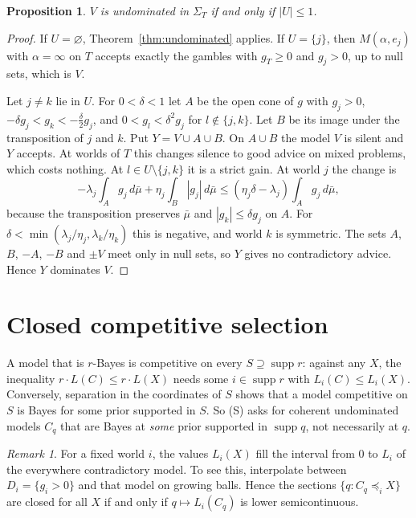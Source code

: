 \documentclass[11pt]{article}
\newtheorem{proposition}[theorem]{Proposition}
\theoremstyle{remark}\newtheorem{remark}[theorem]{Remark}
\newcommand{\supp}{\operatorname{supp}}
\begin{document}
\begin{proposition}\label{prop:V}
$V$ is undominated in $\Sigma_T$ if and only if $|U|\le1$.
\end{proposition}
\begin{proof}
If $U=\varnothing$, Theorem~\ref{thm:undominated} applies. If $U=\{j\}$, then
$M(\alpha,e_j)$ with $\alpha=\infty$ on $T$ accepts exactly the gambles
with $g_T\ge0$ and $g_j>0$, up to null sets, which is $V$.

Let $j\ne k$ lie in $U$. For $0<\delta<1$ let $A$ be the open cone of $g$
with $g_j>0$, $-\delta g_j<g_k<-\tfrac\delta2g_j$, and
$0<g_l<\delta^2g_j$ for $l\notin\{j,k\}$. Let $B$ be its image under the
transposition of $j$ and $k$. Put $Y=V\cup A\cup B$. On $A\cup B$ the model
$V$ is silent and $Y$ accepts. At worlds of $T$ this changes silence to good
advice on mixed problems, which costs nothing. At $l\in U\setminus\{j,k\}$
it is a strict gain. At world $j$ the change is
\[
 -\lambda_j\int_Ag_j\,d\bar\mu+\eta_j\int_B|g_j|\,d\bar\mu
 \le(\eta_j\delta-\lambda_j)\int_Ag_j\,d\bar\mu,
\]
because the transposition preserves $\bar\mu$ and $|g_k|\le\delta g_j$ on
$A$. For $\delta<\min(\lambda_j/\eta_j,\lambda_k/\eta_k)$ this is negative,
and world $k$ is symmetric. The sets $A$, $B$, $-A$, $-B$ and $\pm V$ meet
only in null sets, so $Y$ gives no contradictory advice. Hence $Y$
dominates $V$.
\end{proof}

\section{Closed competitive selection}

A model that is $r$-Bayes is competitive on every $S\supseteq\supp r$:
against any $X$, the inequality $r\cdot L(C)\le r\cdot L(X)$ needs some
$i\in\supp r$ with $L_i(C)\le L_i(X)$. Conversely, separation in the
coordinates of $S$ shows that a model competitive on $S$ is Bayes for some
prior supported in $S$. So (S) asks for coherent undominated models $C_q$
that are Bayes at \emph{some} prior supported in $\supp q$, not necessarily
at $q$.

\begin{remark}\label{rem:lsc}
For a fixed world $i$, the values $L_i(X)$ fill the interval from $0$ to
$L_i$ of the everywhere contradictory model. To see this, interpolate
between $D_i=\{g_i>0\}$ and that model on growing balls. Hence the sections
$\{q:C_q\preceq_iX\}$ are closed for all $X$ if and only if
$q\mapsto L_i(C_q)$ is lower semicontinuous.
\end{remark}
\end{document}

